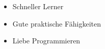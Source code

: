 


\twocolumnsection
{
	\begin{skills}
\end{skills}}{
	\vspace{1em}
		\begin{itemize}
		\item Schneller Lerner
		\item Gute praktische Fähigkeiten            
		\item Liebe Programmieren
	\end{itemize}
}

